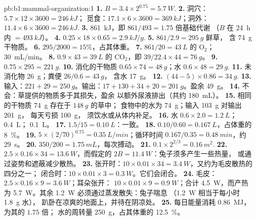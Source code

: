 \begin{solution}{pb:b1:mammal-organization:1}
\textbf{1.} $B = 3.4\times 2^{0.75} = \qty{5.7}{W}$.
\textbf{2.} 洞穴：$5.7\times 12\times 3600 = \qty{246}{kJ}$；
觅食：$17.1\times 6\times 3600 = \qty{369}{kJ}$；洞外：
$11.4\times 6\times 3600 = \qty{246}{kJ}$.
\textbf{3.} \qty{861}{kJ}，即 $861/493 = 1.75$ 倍基础代谢
（$B$ 在 \qty{24}{h} 内 $= \qty{493}{kJ}$）。
\textbf{4.} $0.25\times 18\times 0.65 = \qty{2.9}{kJ/g}$.
\textbf{5.} $861/2.9 = \qty{295}{g}$ 鲜草，
含 \qty{74}{g} 干物质。
\textbf{6.} $295/2000 = 15\%$，占其体重。
\textbf{7.} $861/20 = \qty{43}{L}$ 的 $\mathrm{O_2}$；\qty{30}{mL/min}。
\textbf{8.} $0.9\times 43 = \qty{39}{L}$ 的 $\mathrm{CO_2}$，即 $39/22.4\times 44 = \qty{76}{g}$。
\textbf{9.} $0.75\times 295 = \qty{221}{g}$.
\textbf{10.} 消化的干物质 $0.65\times 74 = \qty{48}{g}$；水
$0.6\times 48 = \qty{29}{g}$.
\textbf{11.} 未消化物 \qty{26}{g}；粪便 $26/0.6 = \qty{43}{g}$，
含水 \qty{17}{g}。
\textbf{12.} $(44 - 5)\times 0.86 = \qty{34}{g}$.
\textbf{13.} 输入：$221 + 29 = \qty{250}{g}$。输出：$17 + 130 + 34 + 20
= \qty{201}{g}$。盈余 \qty{49}{g}。
\textbf{14.} 不会：草提供的物质多于其损失，盈余
以额外尿液排出（共约 \qty{180}{mL}）。
\textbf{15.} 相同的干物质 \qty{74}{g} 存在于 $\qty{148}{g}$ 的草中；
食物中的水为 \qty{74}{g}；输入 \qty{103}{g} 对输出 \qty{201}{g}，
每天亏损 \qty{100}{g}，
须饮水或从体内补足。
\textbf{16.} 水 $0.6\times 2.0 = \qty{1.2}{L}$；
\qty{0.4}{L}； \qty{0.1}{L}。
\textbf{17.} $1.5/15 = \qty{0.10}{L}$：一致。
\textbf{18.} $0.10/0.60 = \qty{0.167}{L}$，占体重的 \qty{8}{\%}。
\textbf{19.} $5\times(2/70)^{0.75} = \qty{0.35}{L/min}$；循环时间
$0.167/0.35 = \qty{0.48}{min}$，约 \qty{29}{s}。
\textbf{20.} $350/200 = \qty{1.75}{mL}$，每次搏动。
\textbf{21.} $0.1\times 2^{2/3} = \qty{0.16}{m^2}$.
\textbf{22.} $2.5\times 0.16\times 34 = \qty{13.6}{W}$，而假定的
$2B = \qty{11.4}{W}$：兔子须多产生一些热量，
或通过姿势和遮蔽减少散热。
\textbf{23.} 张开时：$10\times 0.01\times 34 = \qty{3.4}{W}$，又约为毛皮散热的四分之一；
闭合时：$10\times 0.01\times 3 =
\qty{0.3}{W}$。它们会闭合。
\textbf{24.} 毛皮：$2.5\times 0.16\times 9 = \qty{3.6}{W}$；耳朵张开：
$10\times 0.01\times 9 = \qty{0.9}{W}$；合计 \qty{4.5}{W}，而产热为
\qty{5.7}{W}。其余 \qty{1.2}{W} 必须通过蒸发散失：兔子喘息
（\qty{1.2}{W} 相当于每小时 \qty{1.8}{g} 水），
趴卧在凉爽的地面上，并待在阴凉处。
\textbf{25.} 每日能量消耗 \qty{0.86}{MJ}，为其的 $1.75$ 倍；
水的周转量 \qty{250}{g}，占其体重的 \qty{12.5}{\%}。
\end{solution}
